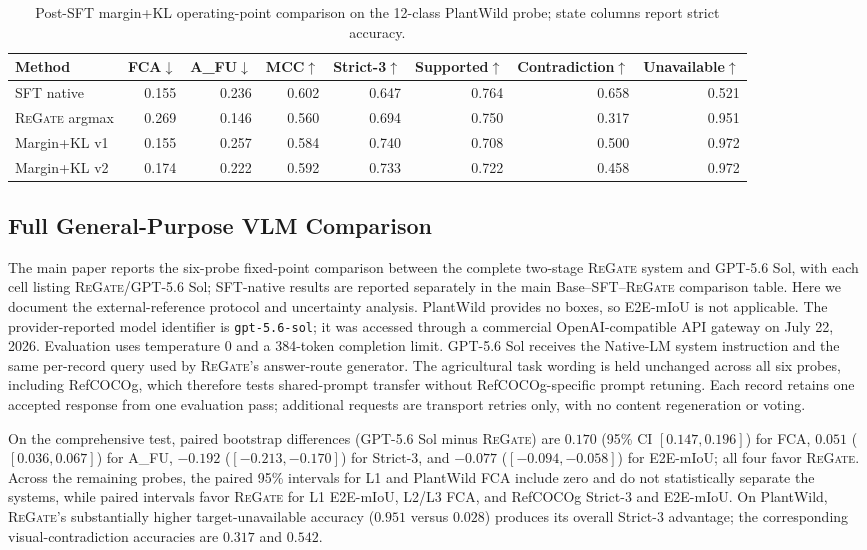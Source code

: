 \documentclass[letterpaper]{article}
\newcommand{\Method}{\textsc{ReGate}\xspace}
\begin{document}
\begin{table}[t]
\centering
\small
\setlength{\tabcolsep}{1mm}
\begin{tabular}{lrrrrrrr}
\toprule
Method & FCA$\downarrow$ & A\_FU$\downarrow$ & MCC$\uparrow$ & Strict-3$\uparrow$ & Supported$\uparrow$ & Contradiction$\uparrow$ & Unavailable$\uparrow$ \\
\midrule
SFT native & 0.155 & 0.236 & 0.602 & 0.647 & 0.764 & 0.658 & 0.521 \\
\Method argmax & 0.269 & 0.146 & 0.560 & 0.694 & 0.750 & 0.317 & 0.951 \\
Margin+KL v1 & 0.155 & 0.257 & 0.584 & 0.740 & 0.708 & 0.500 & 0.972 \\
Margin+KL v2 & 0.174 & 0.222 & 0.592 & 0.733 & 0.722 & 0.458 & 0.972 \\
\bottomrule
\end{tabular}
\caption{Post-SFT margin+KL operating-point comparison on the 12-class PlantWild probe; state columns report strict accuracy.}
\label{tab:margin_kl_plantwild}
\end{table}

\subsection{Full General-Purpose VLM Comparison}
\label{sec:gpt56_full}

The main paper reports the six-probe fixed-point comparison between the complete two-stage \Method system and GPT-5.6 Sol, with each cell listing \Method/GPT-5.6 Sol; SFT-native results are reported separately in the main Base--SFT--\Method comparison table. Here we document the external-reference protocol and uncertainty analysis. PlantWild provides no boxes, so E2E-mIoU is not applicable. The provider-reported model identifier is \texttt{gpt-5.6-sol}; it was accessed through a commercial OpenAI-compatible API gateway on July 22, 2026. Evaluation uses temperature 0 and a 384-token completion limit. GPT-5.6 Sol receives the Native-LM system instruction and the same per-record query used by \Method's answer-route generator. The agricultural task wording is held unchanged across all six probes, including RefCOCOg, which therefore tests shared-prompt transfer without RefCOCOg-specific prompt retuning. Each record retains one accepted response from one evaluation pass; additional requests are transport retries only, with no content regeneration or voting.

On the comprehensive test, paired bootstrap differences (GPT-5.6 Sol minus \Method) are $0.170$ (95\% CI $[0.147,0.196]$) for FCA, $0.051$ ($[0.036,0.067]$) for A\_FU, $-0.192$ ($[-0.213,-0.170]$) for Strict-3, and $-0.077$ ($[-0.094,-0.058]$) for E2E-mIoU; all four favor \Method. Across the remaining probes, the paired 95\% intervals for L1 and PlantWild FCA include zero and do not statistically separate the systems, while paired intervals favor \Method for L1 E2E-mIoU, L2/L3 FCA, and RefCOCOg Strict-3 and E2E-mIoU. On PlantWild, \Method's substantially higher target-unavailable accuracy ($0.951$ versus $0.028$) produces its overall Strict-3 advantage; the corresponding visual-contradiction accuracies are $0.317$ and $0.542$.
\end{document}
